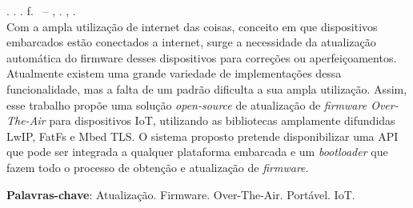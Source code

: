 
\begin{resumo}[RESUMO]
\begin{SingleSpacing}

\imprimirautorcitacao. \imprimirtitulo. \imprimirdata. \pageref {LastPage} f. \imprimirprojeto\ – \imprimirdepartamento, \imprimirinstituicao. \imprimirlocal, \imprimirdata.\\


Com a ampla utilização  de internet das coisas, conceito em que dispositivos embarcados estão conectados a internet, surge a necessidade da atualização automática do firmware desses dispositivos para correções ou aperfeiçoamentos. Atualmente existem uma grande variedade de implementações dessa funcionalidade, mas a falta de um padrão dificulta a sua ampla utilização.
Assim, esse trabalho propõe uma solução \textit{open-source} de atualização de \textit{firmware Over-The-Air} para dispositivos IoT, utilizando as bibliotecas amplamente difundidas LwIP, FatFs e Mbed TLS.
O sistema proposto pretende disponibilizar uma API que pode ser integrada a qualquer plataforma embarcada e um \textit{bootloader} que fazem todo o processo de obtenção e atualização de \textit{firmware}.

\textbf{Palavras-chave}: Atualização. Firmware. Over-The-Air. Portável. IoT.




\end{SingleSpacing}
\end{resumo}


